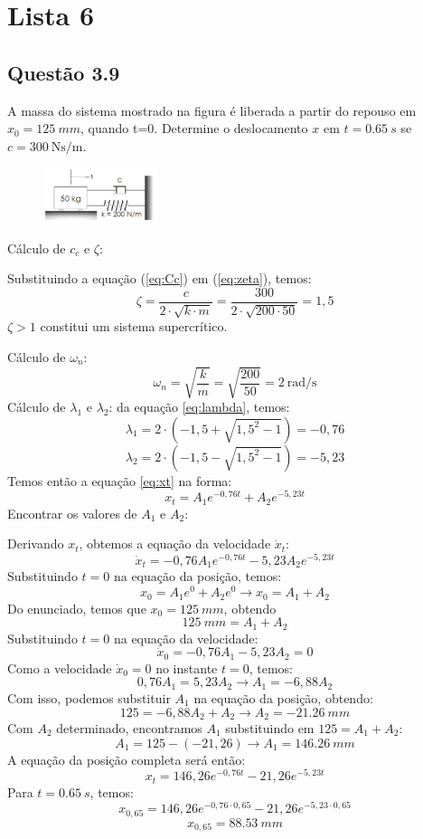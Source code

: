 
\section{Lista 6}
\subsection{Questão 3.9}
A massa do sistema mostrado na figura é liberada a partir do repouso em $x_0 =
\SI{125}{mm}$, quando t=0. Determine o deslocamento $x $ em $t=\SI{0,65}{s}$ se
$c=\SI{300}{\newton\second\per\meter}$.
\begin{figure}[ht]
    \centering
    \includegraphics[width=0.3\textwidth]{imagens/questao_3.9.png}
    \label{fig:questao_3_9}
\end{figure}


\resol

Cálculo de $c_c$ e $\zeta$:

Substituindo a equação (\ref{eq:Cc}) em (\ref{eq:zeta}), temos:
\[
\zeta = \frac{c}{2\cdot \sqrt{k\cdot m}} = \frac{300}{2\cdot \sqrt{200\cdot 50}} = 1,5
\]
$\zeta > 1$ constitui um sistema supercrítico.

Cálculo de $\omega_n$:
\[
\omega_n = \sqrt{\frac{k}{m}} = \sqrt{\frac{200}{50}} =
\SI{2}{\radian\per\second}
\]
Cálculo de $\lambda_1$ e $\lambda_2$:
da equação \ref{eq:lambda}, temos:
\[
    \lambda_1 = 2\cdot (-1,5 + \sqrt{1,5^2-1}) = -0,76
\]
\[
    \lambda_2 = 2\cdot (-1,5 - \sqrt{1,5^2-1}) = -5,23
\]
Temos então a equação \ref{eq:xt} na forma:
\[
x_t = A_1 e^{-0,76 t} + A_2 e^{-5,23 t}
\]
Encontrar os valores de $A_1$ e $A_2$:

Derivando $x_t$, obtemos a equação da velocidade $\dot x_t$:
\[
\dot x_t = -0,76 A_1 e^{-0,76 t}  -5,23 A_2 e^{-5,23 t}
\]
Substituindo $t=0$ na equação da posição, temos:
\[
x_0 = A_1 e^{0} + A_2 e^{0} \to x_0 = A_1 + A_2
\]
Do enunciado, temos que $x_0 = \SI{125}{mm}$, obtendo
\[
\SI{125}{mm} = A_1 + A_2
\]
Substituindo $t=0$ na equação da velocidade:
\[
\dot x_0 = -0,76A_1 - 5,23A_2 = 0
\]
Como a velocidade $\dot x_0 = 0$ no instante $t=0$, temos:
 \[
 0,76A_1 = 5,23A_2 \to A_1 = -6,88A_2
 \]
 Com isso, podemos substituir $A_1$ na equação da posição, obtendo:
\[
125 = -6,88A_2 + A_2 \to A_2 = \SI{-21,26}{mm}
\]
Com $A_2$ determinado, encontramos $A_1$ substituindo em $125 = A_1 + A_2$:
\[
    A_1 = 125 - (-21,26) \to A_1 = \SI{146,26}{mm}
\]
A equação da posição completa será então:
\[
x_t = 146,26 e^{-0,76 t} - 21,26 e^{-5,23 t}
\]
Para $t=\SI{0,65}{s}$, temos:
\[
    x_{0,65} = 146,26 e^{-0,76 \cdot 0,65} - 21,26 e^{-5,23\cdot 0,65}
\]
\[
x_{0,65} = \SI{88,53}{mm}
\]

